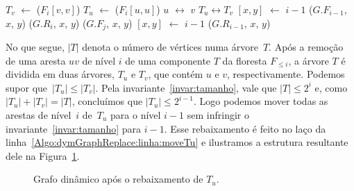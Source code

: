 \begin{algorithm}
\caption{\dymGraphReplace($G$, $u$, $v$, $niv$)}
\label{Algo:dymGraphReplace}
\begin{algorithmic}[1]
\label{Algo:dymGraphReplace:linha:primeira}
\State $T_v$ $\gets$  \treapGetRoot($F_i[v,v]$)
\State $T_u$ $\gets$  \treapGetRoot($F_i[u,u]$)
\State $u$ $\leftrightarrow$ $v$
\State $T_u \leftrightarrow T_v$
\EndIf
{}\label{Algo:dymGraphReplace:linha:moveTu}
\State \nivel$[x,y]$ $\gets$ $i-1$
\State \dymForestAddEdge($G$.$F_{i-1}$, $x$, $y$) 
\EndFor
{}\label{Algo:dymGraphReplace:linha:achaSub}
\State \graphDel($G$.$R_i$, $x$, $y$)
\label{Algo:dymGraphReplace:linha:inseresub}
\State \dymForestAddEdge($G$.$F_j$, $x$, $y$)
\EndFor
\State \Return
\Else
\State \nivel$[x,y]$ $\gets$ $i-1$
\State \graphAdd($G$.$R_{i-1}$, $x$, $y$)
\EndIf
\EndFor
\EndFor\label{Algo:dymGraphReplace:linha:ultima}
\end{algorithmic}
\end{algorithm}


No que segue, $|T|$ denota o número de vértices numa árvore~$T$.
Após a remoção de uma aresta $uv$ de nível $i$ de uma componente $T$ da floresta $F_{\leqslant i}$, a árvore $T$ é dividida em duas árvores, $T_u$ e $T_v$, que contém $u$ e $v$, respectivamente. Podemos supor que~$|T_u|\leqslant |T_v|$. Pela invariante~\ref{invar:tamanho}, vale que $|T| \leq 2^i$ e, como ${|T_u| + |T_v| = |T|}$, concluímos que $|T_u| \leq 2^{i-1}$. Logo podemos mover todas as arestas de nível~$i$ de~$T_u$ para o nível $i-1$ sem infringir o invariante~\ref{invar:tamanho} para $i-1$.  Esse rebaixamento é feito no laço da linha~\ref{Algo:dymGraphReplace:linha:moveTu} e ilustramos a estrutura resultante dele na Figura~\ref{fig:DG-depois-de-rebaixar}.

\begin{figure}[htb]
\centering
\caption{Grafo dinâmico após o rebaixamento de $T_u$.}
\label{fig:DG-depois-de-rebaixar}
\end{figure}

